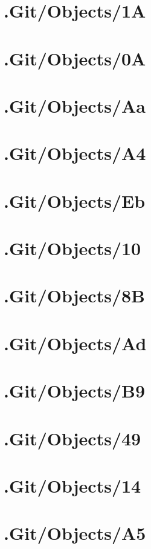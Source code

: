 \section*{.Git/Objects/1A}

\section*{.Git/Objects/0A}

\section*{.Git/Objects/Aa}

\section*{.Git/Objects/A4}

\section*{.Git/Objects/Eb}

\section*{.Git/Objects/10}

\section*{.Git/Objects/8B}

\section*{.Git/Objects/Ad}

\section*{.Git/Objects/B9}

\section*{.Git/Objects/49}

\section*{.Git/Objects/14}

\section*{.Git/Objects/A5}

